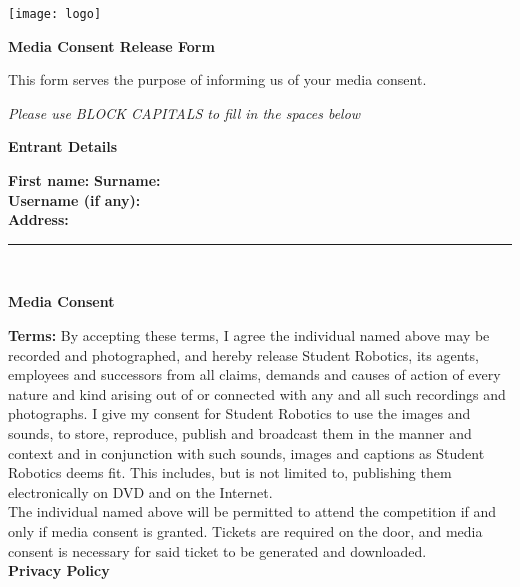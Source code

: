\documentclass[a4paper,10pt]{article}
\newcommand{\textfield}[1]{\textbf{#1:} \hrulefill\hspace{0mm}}
\newcommand{\fieldsep}{\\[2.5mm]}
\newcommand{\textfieldline}{{\hrule\hspace{2mm}\fieldsep}}
\begin{document}
\pagestyle{empty}

\begin{minipage}[c]{0.38\textwidth}
\texttt{[image: logo]}
\end{minipage}
\hspace{0.12\textwidth}
\begin{minipage}[c]{0.48\textwidth}
\begin{center}
{\LARGE \textbf{Media Consent Release Form} \par}
\end{center}
\end{minipage}
\vspace{1cm}

This form serves the purpose of informing us of your media consent.
\begin{center}
\textit{Please use BLOCK CAPITALS to fill in the spaces below}
\end{center}

\textbf{\large Entrant Details}\\\vspace{-2mm}

\textfield{First name}  \textfield{Surname} \fieldsep
\textfield{Username (if any)} \fieldsep
\textfield{Address} \fieldsep
\textfieldline


\textbf{\large Media Consent}\\\vspace{-3mm}

\textbf{Terms:} By accepting these terms, I agree the individual named above may be recorded and photographed, and hereby release Student Robotics, its agents, employees and successors from all claims, demands and causes of action of every nature and kind arising out of or connected with any and all such recordings and photographs.
I give my consent for Student Robotics to use the images and sounds, to store, reproduce, publish and broadcast them in the manner and context and in conjunction with such sounds, images and captions as Student Robotics deems fit.
This includes, but is not limited to, publishing them electronically on DVD and on the Internet.\\

The individual named above will be permitted to attend the competition if and only if media consent is granted.
Tickets are required on the door, and media consent is necessary for said ticket to be generated and downloaded.\\


\textbf{\large Privacy Policy}\\\vspace{-3mm}
\end{document}
